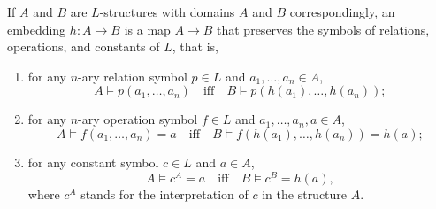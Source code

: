 If $A$ and $B$ are $L$-structures with domains $A$ and $B$ correspondingly, an embedding $h : A \rightarrow B$ is a map $A \rightarrow B$ that preserves the symbols of relations, operations, and constants of $L$, that is,

\begin{enumerate}
\item[(i)] for any $n$-ary relation symbol $p \in L$ and $a_1, \ldots, a_n \in A$,
$$A \vDash p(a_1, \ldots, a_n) \quad \text{iff} \quad B \vDash p(h(a_1), \ldots, h(a_n));$$

\item[(ii)] for any $n$-ary operation symbol $f \in L$ and $a_1, \ldots, a_n, a \in A$,
$$A \vDash f(a_1, \ldots, a_n) = a \quad \text{iff} \quad B \vDash f(h(a_1), \ldots, h(a_n)) = h(a);$$

\item[(iii)] for any constant symbol $c \in L$ and $a \in A$,
$$A \vDash c^A = a \quad \text{iff} \quad B \vDash c^B = h(a),$$
where $c^A$ stands for the interpretation of $c$ in the structure $A$.
\end{enumerate}
